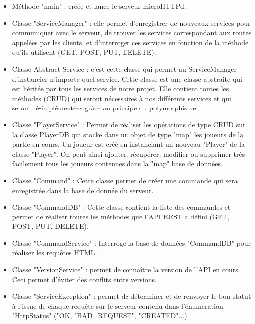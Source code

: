 \documentclass[12pt,a4paper]{article}
\begin{document}
\begin{itemize}
    \item Méthode "main" : créée et lance le serveur microHTTPd.
    \item Classe "ServiceManager" : elle permet d'enregistrer de nouveaux services pour communiquer avec le serveur, de trouver les services correspondant aux routes appelées par les clients, et d'interroger ces services en fonction de la méthode qu'ils utilisent (GET, POST, PUT, DELETE).
    \item Classe Abstract Service : c'est cette classe qui permet au ServiceManager d'instancier n'importe quel service. Cette classe est une classe abstraite qui est héritée par tous les services de notre projet. Elle contient toutes les méthodes (CRUD) qui seront nécessaires à nos différents services et qui seront ré-implémentées grâce au principe du polymorphisme.  
    \item Classe "PlayerService" : Permet de réaliser les opérations de type CRUD sur la classe PlayerDB qui stocke dans un objet de type "map" les joueurs de la partie en cours. Un joueur est créé en instanciant un nouveau "Player" de la classe "Player". On peut ainsi ajouter, récupérer, modifier ou supprimer très facilement tous les joueurs contenues dans la "map" base de données.
    \item Classe "Command" : Cette classe permet de créer une commande qui sera enregistrée dans la base de donnée du serveur. 
    \item Classe "CommandDB" : Cette classe contient la liste des commandes et permet de réaliser toutes les méthodes que l'API REST a défini (GET, POST, PUT, DELETE).
    \item Classe "CommandService" : Interroge la base de données "CommandDB" pour réaliser les requêtes HTML.
    \item Classe "VersionService" : permet de connaître la version de l'API en cours. Ceci permet d'éviter des conflits entre versions. 
    \item Classe "ServiceException" : permet de déterminer et de renvoyer le bon statut à l'issue de chaque requête sur le serveur contenu dans l'énumeration "HttpStatus" ("OK, "BAD\_REQUEST", "CREATED"...).
\end{itemize}
\newpage
\end{document}
